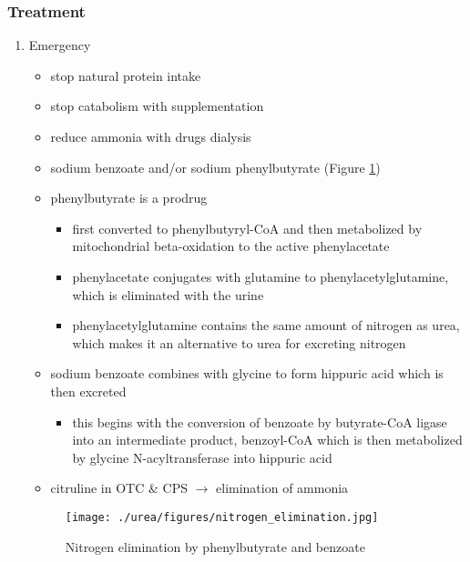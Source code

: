 \documentclass{scrartcl}
\begin{document}
\subsubsection{Treatment}
\label{sec:orgd0e5706}
\begin{enumerate}
\item Emergency
\label{sec:org907b50b}
\begin{itemize}
\item stop natural protein intake
\item stop catabolism with supplementation
\item reduce ammonia with drugs \textpm{} dialysis

\item sodium benzoate and/or sodium phenylbutyrate (Figure \ref{fig:org62cc4e3})

\item phenylbutyrate is a prodrug
\begin{itemize}
\item first converted to phenylbutyryl-CoA and then metabolized by mitochondrial
beta-oxidation to the active phenylacetate
\item phenylacetate conjugates with glutamine to phenylacetylglutamine,
which is eliminated with the urine
\item phenylacetylglutamine contains the same amount of nitrogen as
urea, which makes it an alternative to urea for excreting nitrogen
\end{itemize}

\item sodium benzoate combines with glycine to form hippuric acid which is
then excreted
\begin{itemize}
\item this begins with the conversion of benzoate by butyrate-CoA ligase
into an intermediate product, benzoyl-CoA which is then
metabolized by glycine N-acyltransferase into hippuric acid
\end{itemize}
\item citruline in OTC \& CPS \(\to\) elimination of ammonia
\end{itemize}

\begin{figure}[htbp]
\centering
\texttt{[image: ./urea/figures/nitrogen\_elimination.jpg]}
\caption{\label{fig:org62cc4e3}
Nitrogen elimination by phenylbutyrate and benzoate}
\end{figure}


\end{enumerate}
\end{document}
